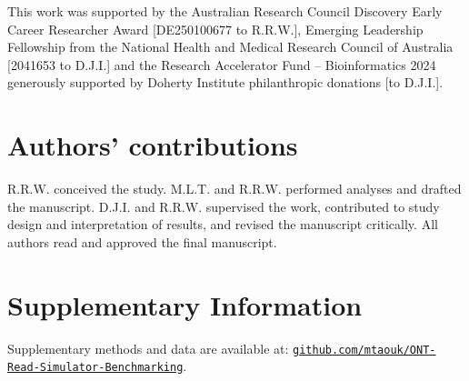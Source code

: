 \documentclass[webpdf,modern,large]{biorxiv}
\begin{document}
This work was supported by the Australian Research Council Discovery Early Career Researcher Award [DE250100677 to R.R.W.], Emerging Leadership Fellowship from the National Health and Medical Research Council of Australia [2041653 to D.J.I.] and the Research Accelerator Fund -- Bioinformatics 2024 generously supported by Doherty Institute philanthropic donations [to D.J.I.].




\section{Authors' contributions}

R.R.W. conceived the study. M.L.T. and R.R.W. performed analyses and drafted the manuscript. D.J.I. and R.R.W. supervised the work, contributed to study design and interpretation of results, and revised the manuscript critically. All authors read and approved the final manuscript.








\clearpage
\onecolumn
\renewcommand{\thetable}{S\arabic{table}}
\renewcommand{\thefigure}{S\arabic{figure}}
\setcounter{table}{0}
\setcounter{figure}{0}



\section*{Supplementary Information}

\noindent Supplementary methods and data are available at: \href{https://github.com/mtaouk/ONT-Read-Simulator-Benchmarking}{\nolinkurl{github.com/mtaouk/ONT-Read-Simulator-Benchmarking}}.


\par\vspace{2.0em}
\end{document}

